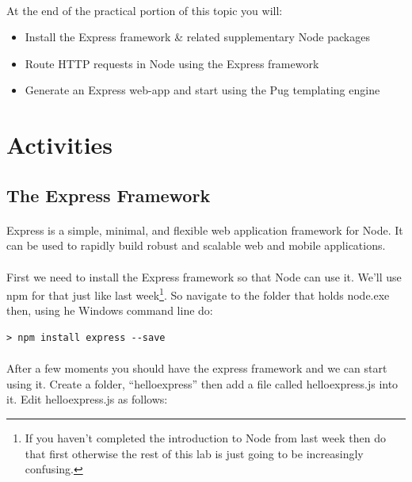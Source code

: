 \documentclass[10pt, a4paper, twosize]{article}
\begin{document}
\paragraph{} At the end of the practical portion of this topic you will:

\begin{itemize}
\item Install the Express framework \& related supplementary Node packages
\item Route HTTP requests in Node using the Express framework
\item Generate an Express web-app and start using the Pug templating engine
\end{itemize}




\section{Activities}

\subsection{The Express Framework}
\paragraph{} Express is a simple, minimal, and flexible web application framework for Node. It can be used to rapidly build robust and scalable web and mobile applications.

\paragraph{} First we need to install the Express framework so that Node can use it. We'll use npm for that just like last week\footnote{If you haven't completed the introduction to Node from last week then do that first otherwise the rest of this lab is just going to be increasingly confusing.}. So navigate to the folder that holds node.exe then, using he Windows command line do:

\begin{lstlisting}[style=DOS]
    > npm install express --save
\end{lstlisting}

\paragraph{} After a few moments you should have the express framework and we can start using it. Create a folder, ``helloexpress'' then add a file called helloexpress.js into it. Edit helloexpress.js as follows:
\end{document}
